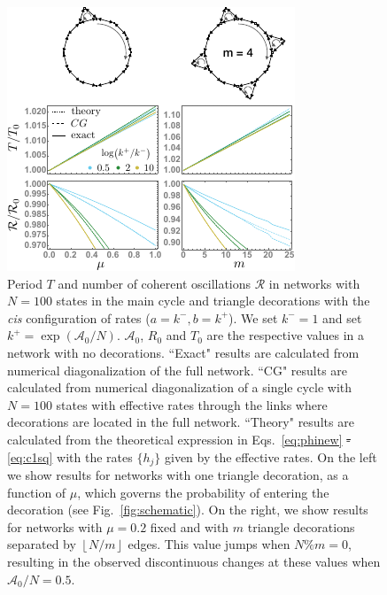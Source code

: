 \documentclass[amsmath, preprintnumbers, 10pt, twocolumn, pre, bibliograpy]{revtex4-1}
\newcommand{\aff}{\mathcal A}
\newcommand{\R}{\mathcal R}
\providecommand{\DIFadd}[1]{{\protect\color{blue}\uwave{#1}}} %
\providecommand{\DIFdel}[1]{{\protect\color{red}\sout{#1}}}                      %
\providecommand{\DIFaddFL}[1]{\DIFadd{#1}} %
\providecommand{\DIFdelFL}[1]{\DIFdel{#1}} %
\providecommand{\DIFaddbeginFL}{} %
\providecommand{\DIFaddendFL}{} %
\providecommand{\DIFdelbeginFL}{} %
\providecommand{\DIFdelendFL}{} %
\newcommand{\DIFscaledelfig}{0.5}
\newlength{\DIFdelgraphicswidth} %
\newlength{\DIFdelgraphicsheight} %
\newcommand{\DIFaddincludegraphics}[2][]{{\color{blue}\fbox{\DIFOincludegraphics[#1]{#2}}}} %
\newcommand{\DIFdelincludegraphics}[2][]{%
\sbox{\DIFdelgraphicsbox}{\DIFOincludegraphics[#1]{#2}}%
\settoboxwidth{\DIFdelgraphicswidth}{\DIFdelgraphicsbox} %
\settoboxtotalheight{\DIFdelgraphicsheight}{\DIFdelgraphicsbox} %
\scalebox{\DIFscaledelfig}{%
\parbox[b]{\DIFdelgraphicswidth}{\usebox{\DIFdelgraphicsbox}\\[-\baselineskip] \rule{\DIFdelgraphicswidth}{0em}}\llap{\resizebox{\DIFdelgraphicswidth}{\DIFdelgraphicsheight}{%
\setlength{\unitlength}{\DIFdelgraphicswidth}%
\begin{picture}(1,1)%
\thicklines\linethickness{2pt} %
{\color[rgb]{1,0,0}\put(0,0){\framebox(1,1){}}}%
{\color[rgb]{1,0,0}\put(0,0){\line( 1,1){1}}}%
{\color[rgb]{1,0,0}\put(0,1){\line(1,-1){1}}}%
\end{picture}%
}\hspace*{3pt}}} %
} %
\DeclareRobustCommand{\DIFaddbeginFL}{\DIFOaddbeginFL \let\includegraphics\DIFaddincludegraphics} %
\DeclareRobustCommand{\DIFaddendFL}{\DIFOaddendFL \let\includegraphics\DIFOincludegraphics} %
\DeclareRobustCommand{\DIFdelbeginFL}{\DIFOdelbeginFL \let\includegraphics\DIFdelincludegraphics} %
\DeclareRobustCommand{\DIFdelendFL}{\DIFOaddendFL \let\includegraphics\DIFOincludegraphics} %
\begin{document}
\begin{figure}
\centering
\includegraphics[width=\linewidth]{fig-3}
 \caption{Period $T$ and number of coherent oscillations $\R$ in networks with $N = 100$ states in the main cycle and triangle decorations with the \DIFaddbeginFL {\it \DIFaddendFL cis\DIFaddbeginFL } \DIFaddendFL configuration of rates ($a = k^-, b = k^+$). We set $k^- = 1$ and set $k^+ = \exp(\aff_0/N)$. $\aff_0$, $R_0$ and $T_0$ are the respective values in a network with no decorations. ``Exact" results are calculated from numerical diagonalization of the full network. ``CG" results are calculated from numerical diagonalization of a single cycle with $N = 100$ states with effective rates through the links where decorations are located in the full network. ``Theory" results are calculated from the theoretical expression in Eqs.~\ref{eq:phinew} \DIFdelbeginFL \DIFdelFL{- }\DIFdelendFL \DIFaddbeginFL \DIFaddFL{and }\DIFaddendFL \ref{eq:c1sq} with the rates $\{h_j\}$ given by the effective rates. On the left we show results for networks with one triangle decoration, as a function of $\mu$, which governs the probability of entering the decoration (see Fig.~\ref{fig:schematic}). On the right, we show results for networks with $\mu = 0.2$ fixed and with $m$ triangle decorations separated by $\left \lfloor{N/m}\right \rfloor$ edges. This value jumps when $N\%m = 0$, resulting in the observed discontinuous changes at these values when $\aff_0/N = 0.5$.}
\label{fig:r-t}
\end{figure}
\end{document}
